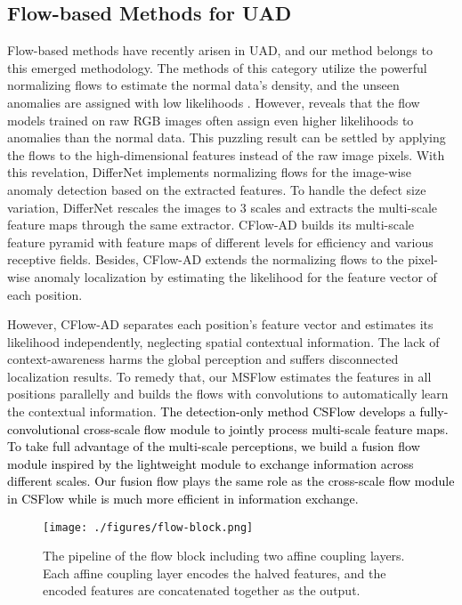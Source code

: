 \documentclass[lettersize,journal]{IEEEtran}
\newcommand{\rounda}[1]{\textcolor{black}{#1}}
\begin{document}
\subsection{Flow-based Methods for UAD} 
Flow-based methods have recently arisen in UAD, and our method belongs to this emerged methodology.
The methods of this category utilize the powerful normalizing flows to estimate the normal data's density, and the unseen anomalies are assigned with low likelihoods \cite{serra2019input}. 
However, \cite{kirichenko2020normalizing} reveals that the flow models trained on raw RGB images often assign even higher likelihoods to anomalies than the normal data. This puzzling result can be settled by applying the flows to the high-dimensional features instead of the raw image pixels.
With this revelation, DifferNet \cite{rudolph2021differnet} implements normalizing flows for the image-wise anomaly detection based on the extracted features.
To handle the defect size variation, DifferNet rescales the images to 3 scales and extracts the multi-scale feature maps through the same extractor. CFlow-AD \cite{rudolph2021differnet} builds its multi-scale feature pyramid with feature maps of different levels for efficiency and various receptive fields. Besides, CFlow-AD extends the normalizing flows to the pixel-wise anomaly localization by estimating the likelihood for the feature vector of each position.

However, CFlow-AD separates each position's feature vector and estimates its likelihood independently, neglecting spatial contextual information. The lack of context-awareness harms the global perception and suffers disconnected localization results. To remedy that, our MSFlow estimates the features in all positions parallelly and builds the flows with  convolutions to automatically learn the contextual information.
\rounda{
The detection-only method CSFlow \cite{rudolph2022csflow} develops a fully-convolutional cross-scale flow module to jointly process multi-scale feature maps. To take full advantage of the multi-scale perceptions, we build a fusion flow module inspired by the lightweight module\cite{yu2021lite} to exchange information across different scales. Our fusion flow plays the same role as the cross-scale flow module in CSFlow while is much more efficient in information exchange. }

\begin{figure}[t]
  \texttt{[image: ./figures/flow-block.png]}
  \caption{The pipeline of the flow block including two affine coupling layers. Each affine coupling layer encodes the halved features, and the encoded features are concatenated together as the output.}
  \label{fig:fusion-block}
\end{figure}
\end{document}
